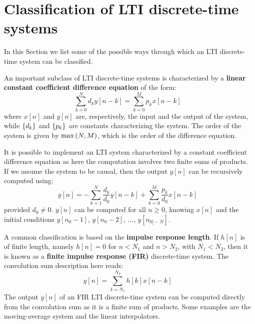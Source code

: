 \documentclass[../../main/main.tex]{subfiles}
\begin{document}
\section{Classification of LTI discrete-time systems}
In this Section we list some of the possible ways through which an LTI discrete-time system can be classified.


\medskip
{}
An important subclass of LTI discrete-time systems is characterized by a \textbf{linear constant coefficient difference equation} of the form:
\begin{equation}
    \sum_{k=0}^{N} d_{k} y[n-k]
    =
    \sum_{k=0}^{M} p_{k} x[n-k]
    \label{eq:L06_S15_1}
\end{equation}
where \( x[n] \) and \( y[n] \) are, respectively, the input and the output of the system, while \( \qty{d_{k}} \) and \( \qty{p_{k}} \) are constants characterizing the system. The order of the system is given by \( \max\qty(N,M) \), which is the order of the difference equation.

It is possible to implement an LTI system characterized by a constant coefficient difference equation as here the computation involves two finite sums of products. If we assume the system to be causal, then the output \( y[n] \) can be recursively computed using:
\begin{equation}
    y[n]
    =
    - \sum_{k=1}^{N} \frac{d_{k}}{d_{0}} y[n-k]
    + \sum_{k=0}^{M} \frac{p_{k}}{d_{0}} x[n-k]
    \label{eq:L06_S17_1}
\end{equation}
provided \( d_{0} \neq 0 \). \( y[n] \) can be computed for all \( n \ge 0 \), knowing \( x[n] \) and the initial conditions \( y[n_{0}-1] \), \( y[n_{0}-2] \), \( \dots \), \( y[n_{0]-N}] \).


\medskip
{}
A common classification is based on the \textbf{impulse response length}. If \( h[n] \) is of finite length, namely \( h[n] = 0 \) for \( n < N_{1} \) and \( n > N_{2} \), with \( N_{1} < N_{2} \), then it is known as a \textbf{finite impulse response (FIR)} discrete-time system. The convolution sum description here reads:
\begin{equation}
    y[n]
    =
    \sum_{k=N_{1}}^{N_{2}} h[k]x[n-k]
    \label{eq:L06_S18_2}
\end{equation}
The output \( y[n] \) of an FIR LTI discrete-time system can be computed directly from the convolution sum as it is a finite sum of products. Some examples are the moving-average system and the linear interpolators.
\end{document}
